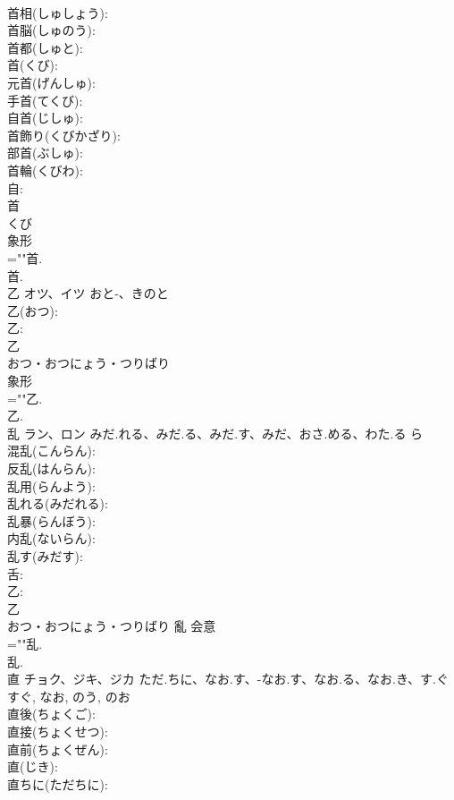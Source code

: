 \documentclass[8pt]{extreport}
\begin{document}
\begin{CJK}{UTF8}{min}
\\	首相(しゅしょう): 
\\	首脳(しゅのう): 
\\	首都(しゅと): 
\\	首(くび): 
\\	元首(げんしゅ): 
\\	手首(てくび): 
\\	自首(じしゅ): 
\\	首飾り(くびかざり): 
\\	部首(ぶしゅ): 
\\	首輪(くびわ): 
\\	自: 
\\	首	
\\	くび	
\\	象形 
\\	=""首.
\\	首.
\\	乙	オツ、イツ	おと-、きのと		
\\	乙(おつ): 
\\	乙: 
\\	乙	
\\	おつ・おつにょう・つりばり	
\\	象形 
\\	=""乙.
\\	乙.
\\	乱	ラン、ロン	みだ.れる、みだ.る、みだ.す、みだ、おさ.める、わた.る	ら	
\\	混乱(こんらん): 
\\	反乱(はんらん): 
\\	乱用(らんよう): 
\\	乱れる(みだれる): 
\\	乱暴(らんぼう): 
\\	内乱(ないらん): 
\\	乱す(みだす): 
\\	舌: 
\\	乙: 
\\	乙	
\\	おつ・おつにょう・つりばり	亂	会意 
\\	=""乱.
\\	乱.
\\	直	チョク、ジキ、ジカ	ただ.ちに、なお.す、-なお.す、なお.る、なお.き、す.ぐ	すぐ, なお, のう, のお	
\\	直後(ちょくご): 
\\	直接(ちょくせつ): 
\\	直前(ちょくぜん): 
\\	直(じき): 
\\	直ちに(ただちに): 

\end{CJK}
\end{document}
